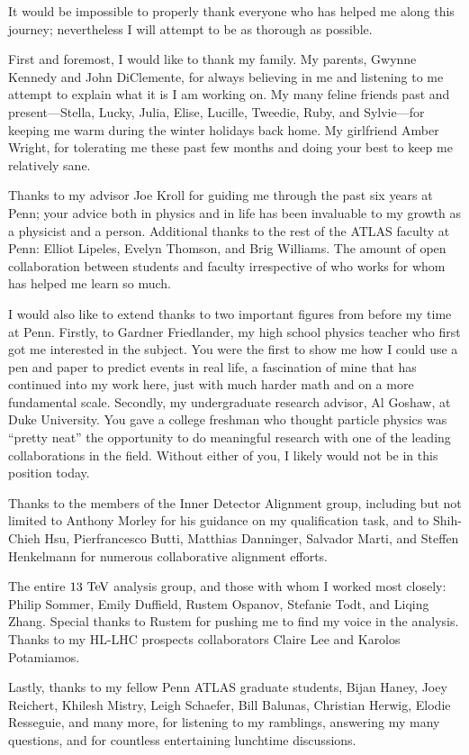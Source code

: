It would be impossible to properly thank everyone who has helped me along this journey; nevertheless I will attempt to be as thorough as possible.

First and foremost, I would like to thank my family.
My parents, Gwynne Kennedy and John DiClemente, for always believing in me and listening to me attempt to explain what it is I am working on.
My many feline friends past and present---Stella, Lucky, Julia, Elise, Lucille, Tweedie, Ruby, and Sylvie---for keeping me warm during the winter holidays back home.
My girlfriend Amber Wright, for tolerating me these past few months and doing your best to keep me relatively sane.

Thanks to my advisor Joe Kroll for guiding me through the past six years at Penn; your advice both in physics and in life has been invaluable to my growth as a physicist and a person.
Additional thanks to the rest of the ATLAS faculty at Penn: Elliot Lipeles, Evelyn Thomson, and Brig Williams.
The amount of open collaboration between students and faculty irrespective of who works for whom has helped me learn so much.

I would also like to extend thanks to two important figures from before my time at Penn.
Firstly, to Gardner Friedlander, my high school physics teacher who first got me interested in the subject.
You were the first to show me how I could use a pen and paper to predict events in real life, a fascination of mine that has continued into my work here, just with much harder math and on a more fundamental scale.
Secondly, my undergraduate research advisor, Al Goshaw, at Duke University.
You gave a college freshman who thought particle physics was ``pretty neat'' the opportunity to do meaningful research with one of the leading collaborations in the field.
Without either of you, I likely would not be in this position today.

Thanks to the members of the Inner Detector Alignment group, including but not limited to Anthony Morley for his guidance on my qualification task, and to Shih-Chieh Hsu, Pierfrancesco Butti, Matthias Danninger, Salvador Marti, and Steffen Henkelmann for numerous collaborative alignment efforts.

The entire \ssww $13\tev$ analysis group, and those with whom I worked most closely: Philip Sommer, Emily Duffield, Rustem Ospanov, Stefanie Todt, and Liqing Zhang.
Special thanks to Rustem for pushing me to find my voice in the analysis.
Thanks to my \ssww HL-LHC prospects collaborators Claire Lee and Karolos Potamiamos.

Lastly, thanks to my fellow Penn ATLAS graduate students, Bijan Haney, Joey Reichert, Khilesh Mistry, Leigh Schaefer, Bill Balunas, Christian Herwig, Elodie Resseguie, and many more, for listening to my ramblings, answering my many questions, and for countless entertaining lunchtime discussions.
